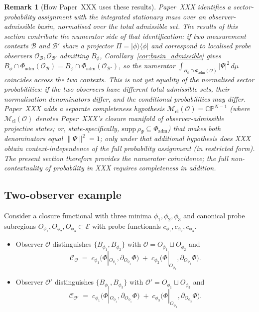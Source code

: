 \documentclass[12pt]{article}
\newtheorem{remark}[theorem]{Remark}
\newcommand{\Ecal}{\mathcal{E}}
\newcommand{\Ocal}{\mathcal{O}}
\newcommand{\Ccal}{\mathcal{C}}
\newcommand{\Mcl}{\mathcal{M}_{\mathrm{cl}}}
\begin{document}
\begin{remark}[How Paper~XXX uses these results]\label{rem:role_xxx}
Paper~XXX identifies a sector-probability assignment with the integrated stationary mass over an observer-admissible basin, \emph{normalised} over the total admissible set. The results of this section contribute the numerator side of that identification: if two measurement contexts $\mathcal{B}$ and $\mathcal{B}'$ share a projector $\Pi = |\phi\rangle\langle\phi|$ and correspond to localised probe observers $\Ocal_{\mathcal{B}}, \Ocal_{\mathcal{B}'}$ admitting $B_\phi$, Corollary~\ref{cor:basin_admissible} gives $B_\phi \cap \Phi_{\mathrm{adm}}(\Ocal_{\mathcal{B}}) = B_\phi \cap \Phi_{\mathrm{adm}}(\Ocal_{\mathcal{B}'})$, so the numerator $\int_{B_\phi \cap \Phi_{\mathrm{adm}}(\Ocal)} |\Psi|^2\, d\mu$ coincides across the two contexts. This is \emph{not} yet equality of the normalised sector probabilities: if the two observers have different total admissible sets, their normalisation denominators differ, and the conditional probabilities may differ. Paper~XXX adds a separate \emph{completeness} hypothesis $\Mcl(\Ocal) = \mathbb{CP}^{N-1}$ (where $\Mcl(\Ocal)$ denotes Paper~XXX's closure manifold of observer-admissible projective states; or, state-specifically, $\mathrm{supp}\,\rho_\Psi \subseteq \Phi_{\mathrm{adm}}$) that makes both denominators equal $\|\Psi\|^2 = 1$; only under that additional hypothesis does XXX obtain context-independence of the full probability assignment (in restricted form). The present section therefore provides the numerator coincidence; the full non-contextuality of probability in XXX requires completeness in addition.
\end{remark}

\subsection{Two-observer example}\label{subsec:two_obs}

Consider a closure functional with three minima $\phi_1, \phi_2, \phi_3$ and canonical probe subregions $O_{\phi_1}, O_{\phi_2}, O_{\phi_3} \subset \Ecal$ with probe functionals $c_{\phi_1}, c_{\phi_2}, c_{\phi_3}$.

\begin{itemize}
    \item Observer $\Ocal$ distinguishes $\{B_{\phi_1}, B_{\phi_2}\}$ with $\Ocal = O_{\phi_1} \sqcup O_{\phi_2}$ and
    \begin{equation}
        \Ccal_\Ocal \;=\; c_{\phi_1}\!\bigl(\Phi|_{O_{\phi_1}}, \partial_{O_{\phi_1}}\Phi\bigr) \;+\; c_{\phi_2}\!\bigl(\Phi|_{O_{\phi_2}}, \partial_{O_{\phi_2}}\Phi\bigr).
    \end{equation}
    \item Observer $\Ocal'$ distinguishes $\{B_{\phi_1}, B_{\phi_3}\}$ with $\Ocal' = O_{\phi_1} \sqcup O_{\phi_3}$ and
    \begin{equation}
        \Ccal_{\Ocal'} \;=\; c_{\phi_1}\!\bigl(\Phi|_{O_{\phi_1}}, \partial_{O_{\phi_1}}\Phi\bigr) \;+\; c_{\phi_3}\!\bigl(\Phi|_{O_{\phi_3}}, \partial_{O_{\phi_3}}\Phi\bigr).
    \end{equation}
\end{itemize}
\end{document}
